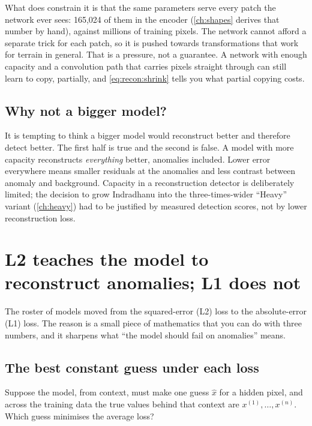 What does constrain it is that the same parameters serve every patch the network ever sees: 165{,}024
of them in the encoder\tagC{} (\cref{ch:shapes} derives that number by hand), against millions of training
pixels. The network cannot afford a separate trick for each patch, so it is pushed towards
transformations that work for terrain in general. That is a pressure, not a guarantee. A network with
enough capacity and a convolution path that carries pixels straight through can still learn to copy,
partially, and \cref{eq:recon:shrink} tells you what partial copying costs.

\subsection{Why not a bigger model?}

It is tempting to think a bigger model would reconstruct better and therefore detect better. The first
half is true and the second is false. A model with more capacity reconstructs \emph{everything}
better, anomalies included. Lower error everywhere means smaller residuals at the anomalies and less
contrast between anomaly and background. Capacity in a reconstruction detector is deliberately limited;
the decision to grow Indradhanu into the three-times-wider ``Heavy'' variant (\cref{ch:heavy}) had to
be justified by measured detection scores, not by lower reconstruction loss.

\section{L2 teaches the model to reconstruct anomalies; L1 does not}\label{sec:recon:l1l2}

The roster of models moved from the squared-error (L2) loss to the absolute-error (L1) loss. The
reason is a small piece of mathematics that you can do with three numbers, and it sharpens what
``the model should fail on anomalies'' means.

\subsection{The best constant guess under each loss}

Suppose the model, from context, must make one guess $\hat{x}$ for a hidden pixel, and across the
training data the true values behind that context are $x^{(1)},\dots,x^{(n)}$. Which guess minimises
the average loss?

